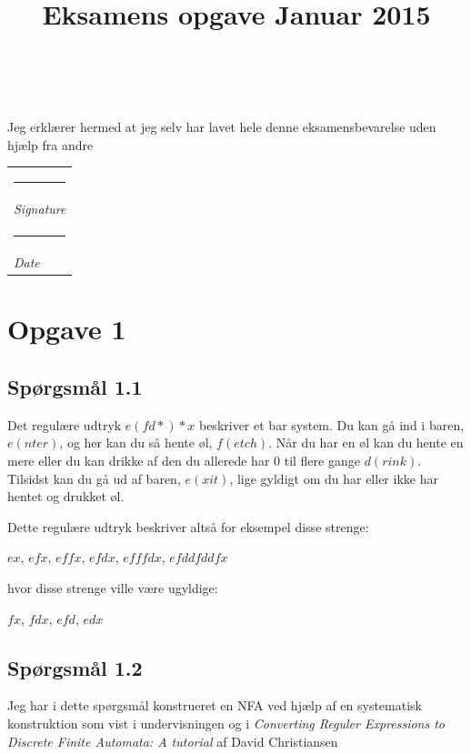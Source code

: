 \documentclass[danish,a4paper]{report}
\title{\Huge \textbf{\titlename}\\\huge Eksamens opgave Januar 2015}
\author{\textsc{\name} \\ \textsc{\email}}
\makeatletter
\newcommand{\namesigdate}[2][10cm]{%
  \begin{tabular}{@{}p{#1}@{}}
    #2 \\[2\normalbaselineskip] \hrule \\[0pt]
    {\small \textit{Signature}} \\[2\normalbaselineskip] \hrule \\[0pt]
    {\small \textit{Date}}
  \end{tabular}
}
\makeatother
\begin{document}
\maketitle

\vspace*{\fill}
\begin{center}
\begin{large}
Jeg erklærer hermed at jeg selv har lavet hele denne eksamensbevarelse uden hjælp fra andre
\end{large}

\vspace*{2cm}
\namesigdate{}
\end{center}

\vspace*{\fill}


\newpage

\chapter*{Opgave 1}
\section*{Spørgsmål 1.1}
Det regulære udtryk $e(fd*)*x$ beskriver et bar system. Du kan gå ind i baren, $e(nter)$, og her kan du så hente øl, $f(etch)$. Når du har en øl kan du hente en mere eller du kan drikke af den du allerede har 0 til flere gange $d(rink)$. Tilsidst kan du gå ud af baren, $e(xit)$, lige gyldigt om du har eller ikke har hentet og drukket øl.

Dette regulære udtryk beskriver altså for eksempel disse strenge:
\begin{center}
$ex$,
$efx$,
$effx$,
$efdx$,
$efffdx$,
$efddfddfx$
\end{center}
hvor disse strenge ville være ugyldige:
\begin{center}
$fx$,
$fdx$,
$efd$,
$edx$
\end{center}
\section*{Spørgsmål 1.2}
\label{sec:sp2}

Jeg har i dette spørgsmål konstrueret en NFA ved hjælp af en systematisk konstruktion som vist i undervisningen og i \textit{Converting Reguler Expressions to Discrete Finite Automata: A tutorial} af David Christiansen\\
\end{document}
